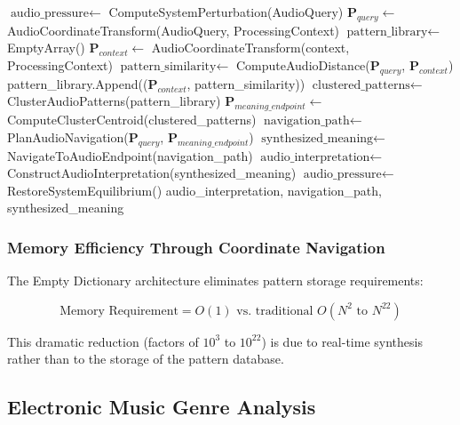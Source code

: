 \documentclass[12pt,a4paper]{article}
\begin{document}
\begin{algorithm}[H]
\caption{Empty Dictionary Audio Synthesis}
\begin{algorithmic}[1]
    \State $\text{audio\_pressure} \gets$ ComputeSystemPerturbation(AudioQuery)
    \State $\mathbf{P}_{query} \gets$ AudioCoordinateTransform(AudioQuery, ProcessingContext)
    \State $\text{pattern\_library} \gets$ EmptyArray()
        \State $\mathbf{P}_{context} \gets$ AudioCoordinateTransform(context, ProcessingContext)
        \State $\text{pattern\_similarity} \gets$ ComputeAudioDistance($\mathbf{P}_{query}$, $\mathbf{P}_{context}$)
        \State pattern\_library.Append(($\mathbf{P}_{context}$, pattern\_similarity))
    \EndFor
    \State $\text{clustered\_patterns} \gets$ ClusterAudioPatterns(pattern\_library)
    \State $\mathbf{P}_{meaning\_endpoint} \gets$ ComputeClusterCentroid(clustered\_patterns)
    \State $\text{navigation\_path} \gets$ PlanAudioNavigation($\mathbf{P}_{query}$, $\mathbf{P}_{meaning\_endpoint}$)
    \State $\text{synthesized\_meaning} \gets$ NavigateToAudioEndpoint(navigation\_path)
    \State $\text{audio\_interpretation} \gets$ ConstructAudioInterpretation(synthesized\_meaning)
    \State $\text{audio\_pressure} \gets$ RestoreSystemEquilibrium()
    \State \Return audio\_interpretation, navigation\_path, synthesized\_meaning
\EndProcedure
\end{algorithmic}
\end{algorithm}

\subsubsection{Memory Efficiency Through Coordinate Navigation}

The Empty Dictionary architecture eliminates pattern storage requirements:

\begin{equation}
\text{Memory Requirement} = O(1) \text{ vs. traditional } O(N^2 \text{ to } N^{22})
\end{equation}

This dramatic reduction (factors of $10^3$ to $10^{22}$) is due to real-time synthesis rather than to the storage of the pattern database.

\subsection{Electronic Music Genre Analysis}
\end{document}
